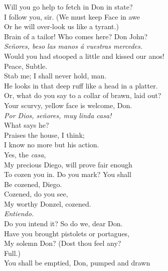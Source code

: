 \documentclass[a4paper,oneside,12pt]{memoir}
\begin{document}
\begin{drama*}
\facespeaks Will you go help to fetch in Don in state?\\
\subtlespeaks I follow you, sir. (We must keep Face in awe\\
Or he will over-look us like a tyrant.)\\
Brain of a tailor! Who comes here? Don John?\\
\surlyspeaks \emph{Se\~{n}ores, beso las manos \'{a} vuestras mercedes.}\\
\subtlespeaks Would you had stooped a little and kissed our anos!\\
\facespeaks Peace, Subtle.\\
\subtlespeaks {} Stab me; I shall never hold, man.\\
He looks in that deep ruff like a head in a platter.\\
\facespeaks Or, what do you say to a collar of brawn, laid out?\\
Your scurvy, yellow face is welcome, Don.\\
\surlyspeaks \emph{Por Dios, se\~{n}ores, muy linda casa!}\\
\subtlespeaks What says he?\\
\facespeaks {} Praises the house, I think;\\
I know no more but his action.\\
\subtlespeaks {} Yes, the \emph{casa},\\
My precious Diego, will prove fair enough\\
To cozen you in. Do you mark? You shall\\
Be cozened, Diego.\\
\facespeaks {} Cozened, do you see,\\
My worthy Donzel, cozened.\\
\surlyspeaks {} \emph{Entiendo.}\\
\subtlespeaks Do you intend it? So do we, dear Don.\\
Have you brought pistolets or portagues,\\
My solemn Don? (Dost thou feel any?\\
\facespeaks {} Full.)\\
\subtlespeaks You shall be emptied, Don, pumped and drawn\\

\end{drama*}
\end{document}
